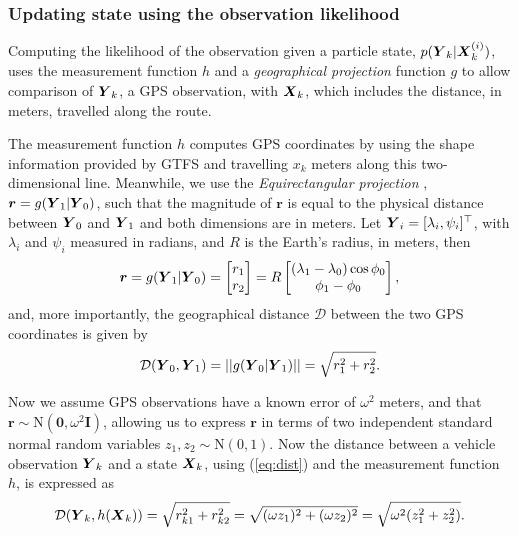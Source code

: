 \documentclass[times, doublespace]{anzsauth}
\newcommand{\br}{\boldsymbol{r}}
\begin{document}
\subsubsection{Updating state using the observation likelihood}
\label{sec:pf_update}

Computing the likelihood of the observation given a particle state,
$p(\mbox{$\boldsymbol{Y}$}_k|\mbox{$\boldsymbol{X}$}_k^{(i)})$,
uses the measurement function $h$ and
a \emph{geographical projection} function $g$ to allow comparison of $\mbox{$\boldsymbol{Y}$}_k$,
a GPS observation, with $\mbox{$\boldsymbol{X}$}_k$,
which includes the distance, in meters, travelled along the route.

The measurement function $h$ computes GPS coordinates by using the
shape information provided by GTFS and travelling $x_k$ meters along
this two-dimensional line.
Meanwhile, we use the \emph{Equirectangular projection} \citep{Snyder_1998},
$\br = g(\bY_1 | \bY_0)$,
such that the magnitude of $\boldsymbol{r}$ is equal to the physical distance
between $\mbox{$\boldsymbol{Y}$}_0$ and $\mbox{$\boldsymbol{Y}$}_1$ and both dimensions are in meters.
Let $\mbox{$\boldsymbol{Y}$}_i = [\lambda_i, \psi_i]^\top$,
with $\lambda_i$ and $\psi_i$ measured in radians,
and $R$ is the Earth's radius, in meters, then
\begin{equation*}
\br =
g(\bY_1 | \bY_0) =
    \begin{bmatrix}
        r_1 \\ r_2
    \end{bmatrix} =
    R \begin{bmatrix}
        (\lambda_1 - \lambda_0)\cos\phi_0 \\
        \phi_1 - \phi_0
    \end{bmatrix},
\end{equation*}
and, more importantly, the geographical distance $\mathcal{D}$ between the two
GPS coordinates is given by
\begin{equation}
\label{eq:dist}
\mathcal{D}(\mbox{$\boldsymbol{Y}$}_0, \mbox{$\boldsymbol{Y}$}_1) = ||g(\mbox{$\boldsymbol{Y}$}_0 | \mbox{$\boldsymbol{Y}$}_1)|| = \sqrt{r_1^2 + r_2^2}.
\end{equation}


Now we assume GPS observations have a known error of $\omega^2$ meters,
and that \mbox{$\br \sim \mathrm{N}(\boldsymbol{0}, \omega^2\mathbf{I})$},
allowing us to express $\br$ in terms of two independent
standard normal random variables $z_1, z_2 \sim \mathrm{N}(0,1)$.
Now the distance between a vehicle observation $\mbox{$\boldsymbol{Y}$}_k$
and a state $\mbox{$\boldsymbol{X}$}_k$, using (\ref{eq:dist}) and the measurement function $h$,
is expressed as
\begin{equation}
\label{eq:obs_dist}
\mathcal{D}(\mbox{$\boldsymbol{Y}$}_k, h(\mbox{$\boldsymbol{X}$}_k)) = \sqrt{r_{k1}^2 + r_{k2}^2}
    = \sqrt{(\omega z_1)^2 + (\omega z_2)^2}
    = \sqrt{\omega^2 (z_1^2 + z_2^2)}.
\end{equation}
\end{document}
